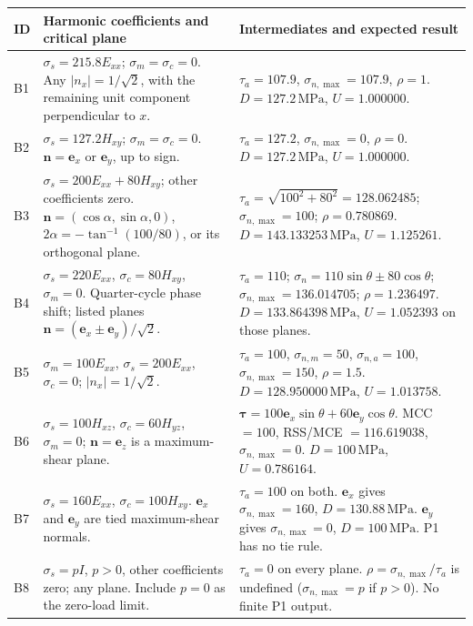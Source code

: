 \documentclass[10pt,a4paper]{article}
\newcommand{\MPa}{\,\mathrm{MPa}}
\newcommand{\sn}{\sigma_{n}}
\newcommand{\ta}{\tau_{a}}
\begin{document}
\small
\begin{longtable}{@{}p{9mm}p{70mm}p{77mm}@{}}
\toprule ID & Harmonic coefficients and critical plane & Intermediates and expected result\\\midrule
\endhead
B1 & $\sigma_s=215.8E_{xx}$; $\sigma_m=\sigma_c=0$. Any $|n_x|=1/\sqrt2$, with the remaining unit component perpendicular to $x$. & $\ta=107.9$, $\sigma_{n,\max}=107.9$, $\rho=1$. $D=127.2\MPa$, $U=1.000000$.\\
B2 & $\sigma_s=127.2H_{xy}$; $\sigma_m=\sigma_c=0$. $\mathbf n=\mathbf e_x$ or $\mathbf e_y$, up to sign. & $\ta=127.2$, $\sigma_{n,\max}=0$, $\rho=0$. $D=127.2\MPa$, $U=1.000000$.\\
B3 & $\sigma_s=200E_{xx}+80H_{xy}$; other coefficients zero. $\mathbf n=(\cos\alpha,\sin\alpha,0)$, $2\alpha=-\tan^{-1}(100/80)$, or its orthogonal plane. & $\ta=\sqrt{100^2+80^2}=128.062485$; $\sigma_{n,\max}=100$; $\rho=0.780869$. $D=143.133253\MPa$, $U=1.125261$.\\
B4 & $\sigma_s=220E_{xx}$, $\sigma_c=80H_{xy}$, $\sigma_m=0$. Quarter-cycle phase shift; listed planes $\mathbf n=(\mathbf e_x\pm\mathbf e_y)/\sqrt2$. & $\ta=110$; $\sn=110\sin\theta\pm80\cos\theta$; $\sigma_{n,\max}=136.014705$; $\rho=1.236497$. $D=133.864398\MPa$, $U=1.052393$ on those planes.\\
B5 & $\sigma_m=100E_{xx}$, $\sigma_s=200E_{xx}$, $\sigma_c=0$; $|n_x|=1/\sqrt2$. & $\ta=100$, $\sigma_{n,m}=50$, $\sigma_{n,a}=100$, $\sigma_{n,\max}=150$, $\rho=1.5$. $D=128.950000\MPa$, $U=1.013758$.\\
B6 & $\sigma_s=100H_{xz}$, $\sigma_c=60H_{yz}$, $\sigma_m=0$; $\mathbf n=\mathbf e_z$ is a maximum-shear plane. & $\boldsymbol\tau=100\mathbf e_x\sin\theta+60\mathbf e_y\cos\theta$. MCC $=100$, RSS/MCE $=116.619038$, $\sigma_{n,\max}=0$. $D=100\MPa$, $U=0.786164$.\\
B7 & $\sigma_s=160E_{xx}$, $\sigma_c=100H_{xy}$. $\mathbf e_x$ and $\mathbf e_y$ are tied maximum-shear normals. & $\ta=100$ on both. $\mathbf e_x$ gives $\sigma_{n,\max}=160$, $D=130.88\MPa$. $\mathbf e_y$ gives $\sigma_{n,\max}=0$, $D=100\MPa$. P1 has no tie rule.\\
B8 & $\sigma_s=pI$, $p>0$, other coefficients zero; any plane. Include $p=0$ as the zero-load limit. & $\ta=0$ on every plane. $\rho=\sigma_{n,\max}/\ta$ is undefined ($\sigma_{n,\max}=p$ if $p>0$). No finite P1 output.\\
\bottomrule
\end{longtable}
\normalsize
\end{document}
